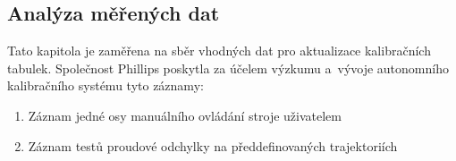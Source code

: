 \subsection{Analýza měřených dat}
Tato kapitola je zaměřena na sběr vhodných dat pro aktualizace kalibračních tabulek. Společnost Phillips poskytla za účelem výzkumu a~vývoje autonomního kalibračního systému tyto záznamy:
\begin{enumerate}
    \item\label{item:analýza soubor jedna osa} Záznam jedné osy manuálního ovládání stroje uživatelem
    \item\label{item:analýza soubor test proudu} Záznam testů proudové odchylky na předdefinovaných trajektoriích
\end{enumerate}
